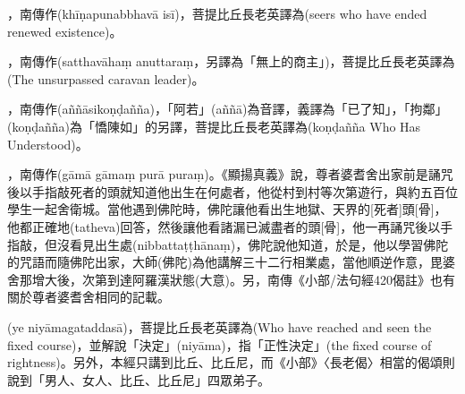 \startitemgroup[noteitems]
\item{}，南傳作(khīṇapunabbhavā isī)，菩提比丘長老英譯為(seers who have ended renewed existence)。
\stopitemgroup

\startitemgroup[noteitems]
\item{}，南傳作(satthavāhaṃ anuttaraṃ，另譯為「無上的商主」)，菩提比丘長老英譯為(The unsurpassed caravan leader)。
\stopitemgroup

\startitemgroup[noteitems]
\item{}，南傳作(aññāsikoṇḍañña)，「阿若」(aññā)為音譯，義譯為「已了知」，「拘鄰」(koṇḍañña)為「憍陳如」的另譯，菩提比丘長老英譯為(koṇḍañña Who Has Understood)。
\stopitemgroup

\startitemgroup[noteitems]
\item{}，南傳作(gāmā gāmaṃ purā puraṃ)。《顯揚真義》說，尊者婆耆舍出家前是誦咒後以手指敲死者的頭就知道他出生在何處者，他從村到村等次第遊行，與約五百位學生一起舍衛城。當他遇到佛陀時，佛陀讓他看出生地獄、天界的[死者]頭[骨]，他都正確地(tatheva)回答，然後讓他看諸漏已滅盡者的頭[骨]，他一再誦咒後以手指敲，但沒看見出生處(nibbattaṭṭhānaṃ)，佛陀說他知道，於是，他以學習佛陀的咒語而隨佛陀出家，大師(佛陀)為他講解三十二行相業處，當他順逆作意，毘婆舍那增大後，次第到達阿羅漢狀態(大意)。另，南傳《小部/法句經420偈註》也有關於尊者婆耆舍相同的記載。
\stopitemgroup

\startitemgroup[noteitems]
\item{}(ye niyāmagataddasā)，菩提比丘長老英譯為(Who have reached and seen the fixed course)，並解說「決定」(niyāma)，指「正性決定」(the fixed course of rightness)。另外，本經只講到比丘、比丘尼，而《小部》〈長老偈〉相當的偈頌則說到「男人、女人、比丘、比丘尼」四眾弟子。
\stopitemgroup

